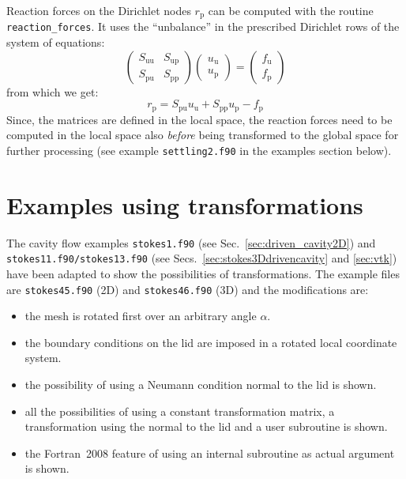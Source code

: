 Reaction forces on the Dirichlet nodes $r_\text{p}$ can be computed with the routine \texttt{reaction\_forces}. It uses the ``unbalance'' in the prescribed Dirichlet rows of the system of equations:
\begin{equation}
   \begin{pmatrix}
      S_{\text{uu}} & S_{\text{up}} \\
      S_{\text{pu}} & S_{\text{pp}} 
   \end{pmatrix} 
   \begin{pmatrix}
      u_\text{u} \\
      u_\text{p}
   \end{pmatrix}=
   \begin{pmatrix}
      f_\text{u} \\
      f_\text{p}
   \end{pmatrix}
   \label{eq:partitionedsystem2}
\end{equation}
from which we get:
\begin{equation}
   r_\text{p} = S_{\text{pu}} u_\text{u} + S_{\text{pp}} u_\text{p} - f_\text{p}
\end{equation}
Since, the matrices are defined in the local space, the reaction forces need to be computed in the local space also \emph{before} being transformed to the global space for further processing (see example \texttt{settling2.f90} in the examples section below).

\section{Examples using transformations}

The cavity flow examples \texttt{stokes1.f90}
 (see Sec.~\ref{sec:driven_cavity2D})
and \texttt{stokes11.f90/stokes13.f90} (see
Secs.~\ref{sec:stokes3Ddrivencavity} and \ref{sec:vtk}) have been adapted to
show the possibilities of transformations. The example files are 
\texttt{stokes45.f90} (2D) and \texttt{stokes46.f90} (3D) and the modifications
are:
\begin{itemize}
   \item the mesh is rotated first over an arbitrary angle $\alpha$.
   \item the boundary conditions on the lid are imposed in a rotated
         local coordinate system.
   \item the possibility of using a Neumann condition normal to the lid is
         shown.
   \item all the possibilities of using a constant transformation matrix,
         a transformation using the normal to the lid and a user subroutine is
         shown. 
   \item the Fortran~2008 feature of using an internal subroutine as actual
         argument is shown.
\end{itemize}

